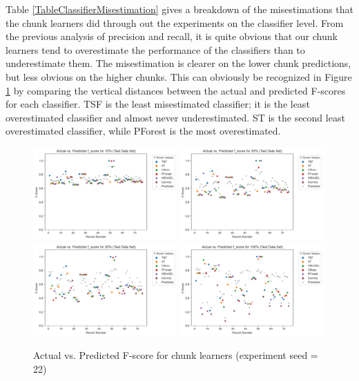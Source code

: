 Table \ref{TableClassifierMisestimation} gives a breakdown of the misestimations that the chunk learners did through out the experiments on the classifier level.
From the previous analysis of precision and recall, it is quite obvious that our chunk learners tend to overestimate the performance of the classifiers than to underestimate them.
The misestimation is clearer on the lower chunk predictions, but less obvious on the higher chunks.
This can obviously be recognized in Figure \ref{Img:ActualvsPredScatter} by comparing the vertical distances between the actual and predicted F-scores for each classifier.
TSF is the least misestimated classifier; it is the least overestimated classifier and almost never underestimated.
ST is the second least overestimated classifier, while PForest is the most overestimated.

\begin{figure}[hp!]
    \captionsetup{justification=raggedright}
    \includegraphics[width=0.49\textwidth,keepaspectratio]{scatter_test_actual_vs_pred_10pct.png}
    \includegraphics[width=0.49\textwidth,keepaspectratio]{scatter_test_actual_vs_pred_20pct.png}
    \\[\smallskipamount]
    \includegraphics[width=0.49\textwidth,keepaspectratio]{scatter_test_actual_vs_pred_30pct.png}
    \includegraphics[width=0.49\textwidth,keepaspectratio]{scatter_test_actual_vs_pred_100pct.png}
    \caption{Actual vs. Predicted F-score for chunk learners (experiment seed = 22)}
    \label{Img:ActualvsPredScatter}
\end{figure}

